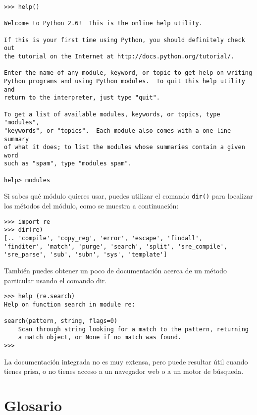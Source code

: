 \beforeverb
\begin{verbatim}
>>> help()

Welcome to Python 2.6!  This is the online help utility.

If this is your first time using Python, you should definitely check out
the tutorial on the Internet at http://docs.python.org/tutorial/.

Enter the name of any module, keyword, or topic to get help on writing
Python programs and using Python modules.  To quit this help utility and
return to the interpreter, just type "quit".

To get a list of available modules, keywords, or topics, type "modules",
"keywords", or "topics".  Each module also comes with a one-line summary
of what it does; to list the modules whose summaries contain a given word
such as "spam", type "modules spam".

help> modules
\end{verbatim}
\afterverb
%
Si sabes qué módulo quieres usar, puedes utilizar el comando {\tt dir()} para localizar los métodos del módulo, como
se muestra a continuación:

\beforeverb
\begin{verbatim}
>>> import re
>>> dir(re)
[.. 'compile', 'copy_reg', 'error', 'escape', 'findall', 
'finditer', 'match', 'purge', 'search', 'split', 'sre_compile', 
'sre_parse', 'sub', 'subn', 'sys', 'template']
\end{verbatim}
\afterverb
%
También puedes obtener un poco de documentación acerca de un método particular usando el comando dir.

\beforeverb
\begin{verbatim}
>>> help (re.search)
Help on function search in module re:

search(pattern, string, flags=0)
    Scan through string looking for a match to the pattern, returning
    a match object, or None if no match was found.
>>> 
\end{verbatim}
\afterverb
%
La documentación integrada no es muy extensa, pero puede resultar útil cuando tienes prisa,
o no tienes acceso a un navegador web o a un motor de búsqueda.

\section{Glosario}

